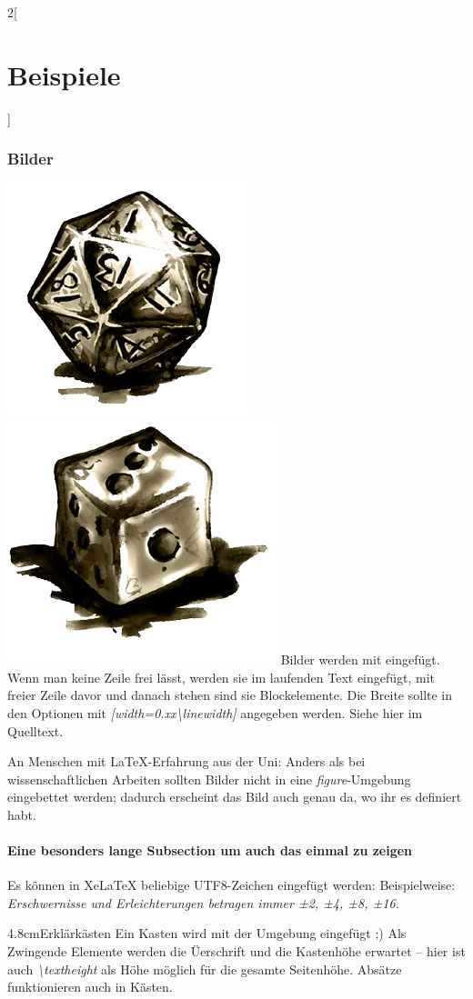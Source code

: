 \documentclass[linksbund,ATvorVT]{rpg-ilaris}
\begin{document}
\begin{multicols}{2}[        %
		\chapter*{Beispiele}  %
		]
\subsection{Bilder}
\includegraphics[width=0.5\linewidth]{würfel20.png}
\includegraphics[width=0.3\linewidth]{würfel6.png} 
%
	Bilder werden mit  eingefügt. Wenn man keine Zeile frei lässt, werden sie im laufenden Text eingefügt, mit freier Zeile davor und danach stehen sind sie Blockelemente.
	Die Breite sollte in den Optionen mit \emph{[width=0.xx\textbackslash{}linewidth]}  angegeben werden. 
	 Siehe hier im Quelltext. 

	An Menschen mit \LaTeX-Erfahrung aus der Uni:
     Anders als bei wissenschaftlichen Arbeiten sollten Bilder nicht in eine \emph{figure}-Umgebung eingebettet werden;
	 dadurch erscheint das Bild auch genau da, wo ihr es definiert habt.

\subsubsection{Eine besonders lange Subsection um auch das einmal zu zeigen}
Es können in XeLaTeX beliebige UTF8-Zeichen eingefügt werden: Beispielweise: 
	\emph{Erschwernisse und Erleichterungen betragen immer ±2, ±4, ±8, ±16.}

\begin{kasten}{4.8cm}{Erklärkästen}
	Ein Kasten wird mit der Umgebung  eingefügt ;) Als Zwingende Elemente werden die Üerschrift und die Kastenhöhe erwartet – hier ist auch \emph{\textbackslash{}textheight} als Höhe möglich für die gesamte Seitenhöhe.  
	Absätze funktionieren auch in Kästen.


\end{kasten}
\end{multicols}
\end{document}
